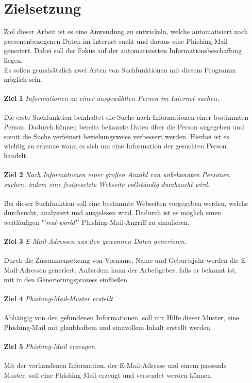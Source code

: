\section{Zielsetzung}
\label {sec:Zielsetzung}
 Ziel dieser Arbeit ist es eine Anwendung zu entwickeln, welche automatisiert nach personenbezogenen Daten im Internet sucht und daraus eine Phishing-Mail generiert. Dabei soll der Fokus auf der automatisierten Informationsbeschaffung liegen.\\ 
 Es sollen grundsätzlich zwei Arten von Suchfunktionen mit diesem Programm möglich sein. \\\\
 {\bf Ziel 1} \textit{Informationen zu einer ausgewählten Person im Internet suchen.}\\\\
 Die erste Suchfunktion beinhaltet die Suche nach Informationen einer bestimmten Person. Dadurch können bereits bekannte Daten über die Person angegeben und somit die Suche verfeinert beziehungsweise verbessert werden. Hierbei ist es wichtig zu erkenne wann es sich um eine Information der gesuchten Person handelt.\\\\
 {\bf Ziel 2} \textit{Nach Informationen einer großen Anzahl von unbekannten Personen suchen, indem eine festgesetzte Webseite vollständig durchsucht wird.}\\\\
 Bei dieser Suchfunktion soll eine bestimmte Webseiten vorgegeben werden, welche durchsucht, analysiert und ausgelesen wird. Dadurch ist es möglich einen weitläufigen "'\textit{real-world}"' Phishing-Mail-Angriff zu simulieren.\\\\
 {\bf Ziel 3} \textit{E-Mail-Adressen aus den gewonnen Daten generieren.}\\\\
 Durch die Zusammensetzung von Vorname, Name und Geburtsjahr werden die E-Mail-Adressen generiert. Außerdem kann der Arbeitgeber, falls er bekannt ist, mit in den Generierungsprozess einfließen.\\\\
 {\bf Ziel 4} \textit{Phishing-Mail-Muster erstellt}\\\\
 Abhängig von den gefundenen Informationen, soll mit Hilfe dieser Muster, eine Phishing-Mail mit glaubhaftem und sinnvollem Inhalt erstellt werden.\\\\
 {\bf Ziel 5} \textit{Phishing-Mail erzeugen.}\\\\
 Mit der vorhandenen Information, der E-Mail-Adresse und einem passende Muster, soll eine Phishing-Mail erzeugt und versendet werden können.
 
